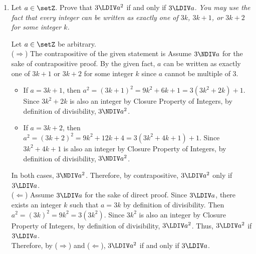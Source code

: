 \newpage
\begin{enumerate} 
  \item Let $a \in \setZ$. Prove that $3\LDIV a^2$ if and only if $3\LDIV a$.
  \label{prob:divisibility-by-3} %
  \textit{You may use the fact that every integer can be written as 
  exactly one of $3k$, $3k + 1$, or $3k+2$ for some integer $k$.}
  \begin{subprove}
    Let $a \in \setZ$ be arbitrary. \vspace*{10px}\\
    ($\Rightarrow$) The contrapositive of the given statement is 
    Assume $3\NDIV a$ for the sake of contrapositive proof. 
    By the given fact, $a$ can be written as exactly one of $3k + 1$ or $3k+2$ for some 
    integer $k$ since $a$ cannot be multiple of $3$.
    \begin{itemize}
      \item If $a = 3k + 1$, then $a^2 = (3k + 1)^2 = 9k^2 + 6k + 1 = 3(3k^2 + 2k) + 1$. 
      Since $3k^2 + 2k$ is also an integer by Closure Property of Integers, by definition of 
      divisibility, $3\NDIV a^2$.
      \item If $a = 3k + 2$, then $a^2 = (3k + 2)^2 = 9k^2 + 12k + 4 = 3(3k^2 + 4k + 1) + 1$. 
      Since $3k^2 + 4k + 1$ is also an integer by Closure Property of Integers, by definition of 
      divisibility, $3\NDIV a^2$.
    \end{itemize}
    In both cases, $3\NDIV a^2$.
    Therefore, by contrapositive, $3\LDIV a^2$ only if $3\LDIV a$.\vspace*{10px}\\
    ($\Leftarrow$) Assume $3\LDIV a$ for the sake of direct proof. 
    Since $3\LDIV a$, there exists an integer $k$ such that $a = 3k$ by definition of divisibility.
    Then $a^2 = (3k)^2 = 9k^2 = 3(3k^2)$.
    Since $3k^2$ is also an integer by Closure Property of Integers, by definition of divisibility, $3\LDIV a^2$.
    Thus, $3\LDIV a^2$ if $3\LDIV a$.\vspace*{10px}\\
    Therefore, by ($\Rightarrow$) and ($\Leftarrow$), $3\LDIV a^2$ if and only if $3\LDIV a$.
  \end{subprove}
  

\end{enumerate}
